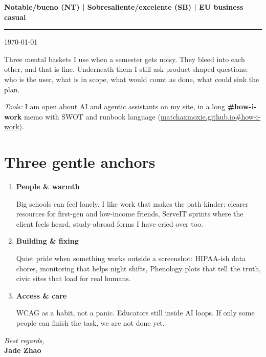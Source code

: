 \documentclass[11pt]{article}
\begin{document}

\vspace{0.25em}\newline\noindent\textbf{Notable/bueno (NT) \;|\; Sobresaliente/excelente (SB) \;|\; EU business casual}\n

\vspace{0.5em}
\noindent\rule{\linewidth}{1pt}
\vspace{0.5em}

\noindent\today

\vspace{0.75em}

\noindent
Three mental baskets I use when a semester gets noisy. They bleed into each other, and that is fine. Underneath them I still ask product-shaped questions: who is the user, what is in scope, what would count as done, what could sink the plan.

\noindent\textit{Tools:} I am open about AI and agentic assistants on my site, in a long \textbf{\#how-i-work} memo with SWOT and runbook language (\href{https://matchaxmoxie.github.io/matchaxmoxie/\#how-i-work}{matchaxmoxie.github.io\#how-i-work}).

\section*{Three gentle anchors}

\begin{enumerate}
    \item \textbf{People \& warmth}

    Big schools can feel lonely. I like work that makes the path kinder: clearer resources for first-gen and low-income friends, ServeIT sprints where the client feels heard, study-abroad forms I have cried over too.

    \item \textbf{Building \& fixing}

    Quiet pride when something works outside a screenshot: HIPAA-ish data chores, monitoring that helps night shifts, Phenology plots that tell the truth, civic sites that load for real humans.

    \item \textbf{Access \& care}

    WCAG as a habit, not a panic. Educators still inside AI loops. If only some people can finish the task, we are not done yet.
\end{enumerate}

\vspace{1em}
\noindent\textit{Best regards,}\\
\textbf{Jade Zhao}
\end{document}
